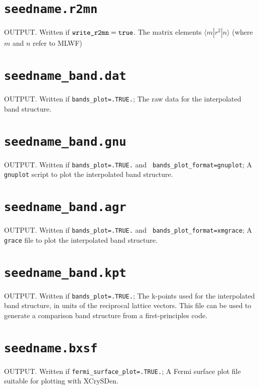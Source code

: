 
\section{{\tt seedname.r2mn}}
OUTPUT.
Written if $\verb#write_r2mn#=\verb#true#$. The matrix elements
$\langle m|r^2|n\rangle$ (where $m$ and $n$ refer to MLWF)

\section{{\tt seedname\_band.dat}}
OUTPUT. Written if {\tt bands\_plot=.TRUE.}; The raw data for the
interpolated band structure.

\section{{\tt seedname\_band.gnu}}
OUTPUT. Written if {\tt bands\_plot=.TRUE.} and {\tt
  bands\_plot\_format=gnuplot}; A {\tt gnuplot} script to plot the
  interpolated band structure.

\section{{\tt seedname\_band.agr}}
OUTPUT. Written if {\tt bands\_plot=.TRUE.} and {\tt
  bands\_plot\_format=xmgrace}; A {\tt grace} file to plot the
  interpolated band structure.


\section{{\tt seedname\_band.kpt}}
OUTPUT. Written if {\tt bands\_plot=.TRUE.}; The k-points used for the
interpolated band structure, in units of the reciprocal lattice
vectors. This file can be used to generate a comparison band structure
from a first-principles code.

\section{{\tt seedname.bxsf}}
OUTPUT. Written if {\tt fermi\_surface\_plot=.TRUE.}; A Fermi surface plot file
suitable for plotting with XCrySDen.


